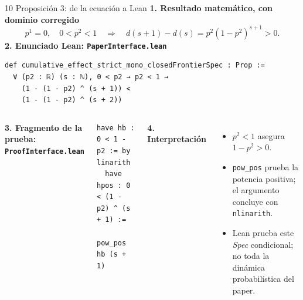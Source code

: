 \documentclass[aspectratio=169,11pt]{beamer}
\begin{document}
\begin{frame}[fragile]{10 \textperiodcentered{} Proposición 3: de la ecuación a Lean}
  \small
  \textbf{1. Resultado matemático, con dominio corregido}
  \[
    p^1=0,\quad 0<p^2<1
    \quad\Longrightarrow\quad
    d(s+1)-d(s)=p^2(1-p^2)^{s+1}>0.
  \]
  \vspace{-0.6em}
  \textbf{2. Enunciado Lean: \texttt{PaperInterface.lean}}
\begin{lstlisting}
def cumulative_effect_strict_mono_closedFrontierSpec : Prop :=
  ∀ (p2 : ℝ) (s : ℕ), 0 < p2 → p2 < 1 →
    (1 - (1 - p2) ^ (s + 1)) <
    (1 - (1 - p2) ^ (s + 2))
\end{lstlisting}
  \vspace{-0.45em}
  \begin{columns}[T,onlytextwidth]
      \textbf{3. Fragmento de la prueba: \texttt{ProofInterface.lean}}
\begin{lstlisting}[basicstyle=\ttfamily\tiny]
  have hb : 0 < 1 - p2 := by linarith
  have hpos : 0 < (1 - p2) ^ (s + 1) :=
    pow_pos hb (s + 1)
\end{lstlisting}
      \textbf{4. Interpretación}
      \begin{itemize}\scriptsize
        \item $p^2<1$ asegura $1-p^2>0$.
        \item \texttt{pow\_pos} prueba la potencia positiva; el argumento concluye con \texttt{nlinarith}.
        \item Lean prueba este \emph{Spec} condicional; no toda la dinámica probabilística del paper.
      \end{itemize}
  \end{columns}
\end{frame}
\end{document}
